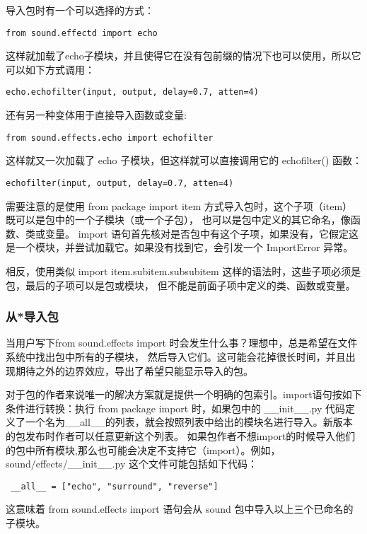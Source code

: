 \documentclass[UTF8]{ctexart}
\begin{document}
导入包时有一个可以选择的方式：
\begin{verbatim}
from sound.effectd import echo
\end{verbatim}

这样就加载了echo子模块，并且使得它在没有包前缀的情况下也可以使用，所以它可以如下方式调用：
\begin{verbatim}
echo.echofilter(input, output, delay=0.7, atten=4)
\end{verbatim}

还有另一种变体用于直接导入函数或变量:
\begin{verbatim}
from sound.effects.echo import echofilter
\end{verbatim}

这样就又一次加载了 echo 子模块，但这样就可以直接调用它的 echofilter() 函数：
\begin{verbatim}
echofilter(input, output, delay=0.7, atten=4)
\end{verbatim}

需要注意的是使用 from package import item 方式导入包时，这个子项（item）既可以是包中的一个子模块（或一个子包），
也可以是包中定义的其它命名，像函数、类或变量。
import 语句首先核对是否包中有这个子项，如果没有，它假定这是一个模块，并尝试加载它。如果没有找到它，会引发一个 ImportError 异常。

相反，使用类似 import item.subitem.subsubitem 这样的语法时，这些子项必须是包，最后的子项可以是包或模块，
但不能是前面子项中定义的类、函数或变量。

\subsubsection{从*导入包}
当用户写下from sound.effects import \* 时会发生什么事？理想中，总是希望在文件系统中找出包中所有的子模块，
然后导入它们。这可能会花掉很长时间，并且出现期待之外的边界效应，导出了希望只能显示导入的包。

对于包的作者来说唯一的解决方案就是提供一个明确的包索引。import语句按如下条件进行转换：执行 from package import \*  时，如果包中的
\_\_init\_\_.py 代码定义了一个名为\_\_all\_\_的列表，就会按照列表中给出的模块名进行导入。新版本的包发布时作者可以任意更新这个列表。
如果包作者不想import\*的时候导入他们的包中所有模块,那么也可能会决定不支持它（import\*）。例如，sound/effects/\_\_init\_\_.py
这个文件可能包括如下代码：
\begin{verbatim}
 __all__ = ["echo", "surround", "reverse"]
\end{verbatim}

这意味着 from sound.effects import \* 语句会从 sound 包中导入以上三个已命名的子模块。
\end{document}
